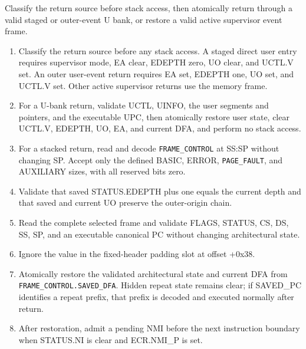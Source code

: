 Classify the return source before stack access, then atomically return through a valid staged or outer-event U bank, or restore a valid active supervisor event frame.

{\raggedright
\begin{enumerate}
\item Classify the return source before any stack access. A staged direct user entry requires supervisor mode, EA clear, EDEPTH zero, UO clear, and UCTL.V set. An outer user-event return requires EA set, EDEPTH one, UO set, and UCTL.V set. Other active supervisor returns use the memory frame.
\item For a U-bank return, validate UCTL, UINFO, the user segments and pointers, and the executable UPC, then atomically restore user state, clear UCTL.V, EDEPTH, UO, EA, and current DFA, and perform no stack access.
\item For a stacked return, read and decode \texttt{FRAME\_CONTROL} at SS:SP without changing SP. Accept only the
defined BASIC, ERROR, \texttt{PAGE\_FAULT}, and AUXILIARY sizes, with all reserved bits zero.
\item Validate that saved STATUS.EDEPTH plus one equals the current depth and that saved and current UO preserve the outer-origin chain.
\item Read the complete selected frame and validate FLAGS, STATUS, CS, DS, SS, SP, and an executable canonical PC without changing architectural state.
\item Ignore the value in the fixed-header padding slot at offset +0x38.
\item Atomically restore the validated architectural state and current DFA from
\texttt{FRAME\_CONTROL.SAVED\_DFA}. Hidden repeat state remains clear;
if SAVED\_PC identifies a repeat prefix, that prefix is decoded and executed normally after return.
\item After restoration, admit a pending NMI before the next instruction boundary when STATUS.NI is clear and ECR.NMI\_P is set.
\end{enumerate}
\par}
